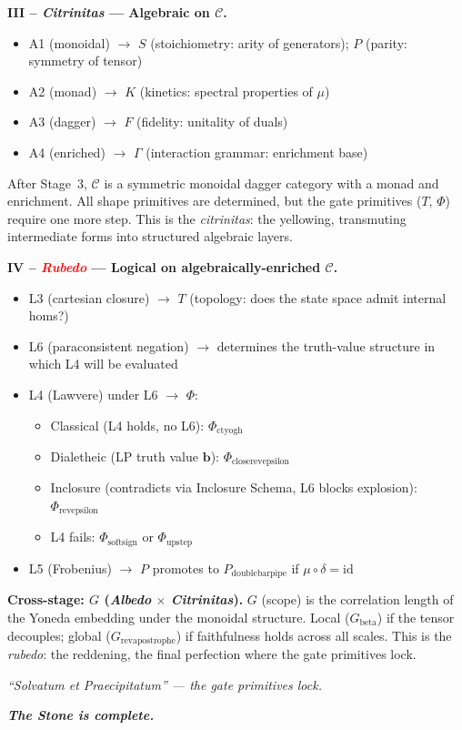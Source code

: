 \documentclass[twocolumn]{article}
\begin{document}
\bigskip
\noindent\textbf{\large III -- \colorbox{yellow!20}{\textcolor{yellow!90!black}{\emph{Citrinitas}}} --- Algebraic on $\mathcal{C}$.}
\begin{itemize}[nosep, leftmargin=1.5em]
\item A1 (monoidal) $\to$ $S$ (stoichiometry: arity of generators); $P$ (parity: symmetry of tensor)
\item A2 (monad) $\to$ $K$ (kinetics: spectral properties of $\mu$)
\item A3 (dagger) $\to$ $F$ (fidelity: unitality of duals)
\item A4 (enriched) $\to$ $\Gamma$ (interaction grammar: enrichment base)
\end{itemize}
After Stage~3, $\mathcal{C}$ is a symmetric monoidal dagger category with a monad and enrichment.
All shape primitives are determined, but the gate primitives ($T$, $\Phi$) require one more step.
{\large This is the \emph{citrinitas}: the yellowing, transmuting intermediate forms into structured algebraic layers.}

\bigskip
\noindent\textbf{\large IV -- \textcolor{red}{\emph{Rubedo}} --- Logical on algebraically-enriched $\mathcal{C}$.}
\begin{itemize}[nosep, leftmargin=1.5em]
\item L3 (cartesian closure) $\to$ $T$ (topology: does the state space admit internal homs?)
\item L6 (paraconsistent negation) $\to$ determines the truth-value structure in which L4 will be evaluated
\item L4 (Lawvere) under L6 $\to$ $\Phi$:
\begin{itemize}[nosep, leftmargin=1em]
\item[\small$\circ$] Classical (L4 holds, no L6): $\Phi_{\text{ctyogh}}$
\item[\small$\circ$] Dialetheic (LP truth value $\mathbf{b}$): $\Phi_{\text{closerevepsilon}}$
\item[\small$\circ$] Inclosure (contradicts via Inclosure Schema, L6 blocks explosion): $\Phi_{\text{revepsilon}}$
\item[\small$\circ$] L4 fails: $\Phi_{\text{softsign}}$ or $\Phi_{\text{upstep}}$
\end{itemize}
\item L5 (Frobenius) $\to$ $P$ promotes to $P_{\text{doublebarpipe}}$ if $\mu \circ \delta = \text{id}$
\end{itemize}

\bigskip
\noindent\textbf{Cross-stage: $G$ (\emph{Albedo} $\times$ \emph{Citrinitas}).}
$G$ (scope) is the correlation length of the Yoneda embedding under the monoidal structure.
Local ($G_{\text{beta}}$) if the tensor decouples; global ($G_{\text{revapostrophe}}$) if faithfulness holds across all scales.
\medskip
{\large This is the \emph{rubedo}: the reddening, the final perfection where the gate primitives lock.}

\bigskip
\textit{\large ``Solvatum et Praecipitatum'' --- the gate primitives lock.}

\bigskip
\textbf{\textit{\Large The Stone is complete.}}
\end{document}
